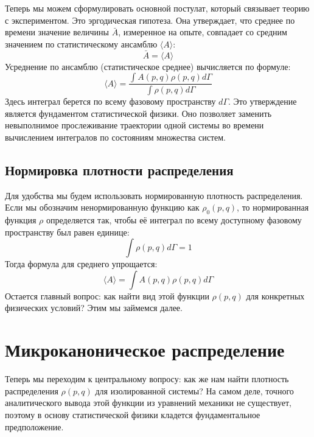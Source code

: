 \documentclass[../general/general]{subfiles}
\begin{document}
Теперь мы можем сформулировать основной постулат, который связывает теорию с экспериментом. Это эргодическая гипотеза. Она утверждает, что среднее по времени значение величины $\bar{A}$, измеренное на опыте, совпадает со средним значением по статистическому ансамблю $\langle A \rangle$:
\begin{equation}
    \bar{A} = \langle A \rangle
\end{equation}
Усреднение по ансамблю (статистическое среднее) вычисляется по формуле:
\begin{equation}
    \langle A \rangle = \frac{\int A(p, q) \rho(p, q) d\Gamma}{\int \rho(p, q) d\Gamma}
\end{equation}
Здесь интеграл берется по всему фазовому пространству $d\Gamma$. Это утверждение является фундаментом статистической физики. Оно позволяет заменить невыполнимое прослеживание траектории одной системы во времени вычислением интегралов по состояниям множества систем.

\subsection{Нормировка плотности распределения}

Для удобства мы будем использовать нормированную плотность распределения. Если мы обозначим ненормированную функцию как $\rho_0(p, q)$, то нормированная функция $\rho$ определяется так, чтобы её интеграл по всему доступному фазовому пространству был равен единице:
\begin{equation}
    \int \rho(p, q) d\Gamma = 1
\end{equation}
Тогда формула для среднего упрощается:
\begin{equation}
    \langle A \rangle = \int A(p, q) \rho(p, q) d\Gamma
\end{equation}
Остается главный вопрос: как найти вид этой функции $\rho(p, q)$ для конкретных физических условий? Этим мы займемся далее.

\section{Микроканоническое распределение}

Теперь мы переходим к центральному вопросу: как же нам найти плотность распределения $\rho(p, q)$ для изолированной системы? На самом деле, точного аналитического вывода этой функции из уравнений механики не существует, поэтому в основу статистической физики кладется фундаментальное предположение.
\end{document}
